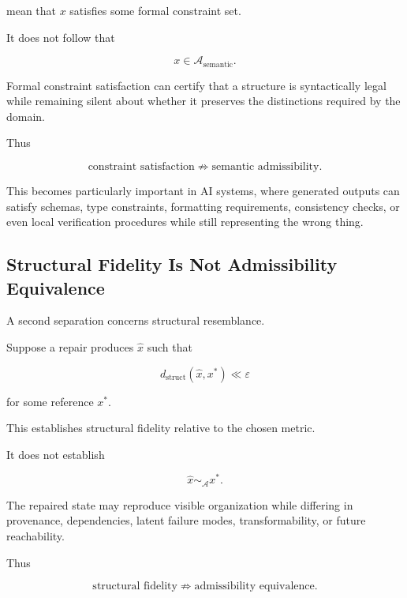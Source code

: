 \documentclass[11pt]{article}
\theoremstyle{remark}
\newcommand{\Adm}{\mathcal{A}}
\begin{document}
mean that $x$ satisfies some formal constraint set.

It does not follow that

\begin{equation}
x\in\mathcal{A}_{\mathrm{semantic}}.
\end{equation}

Formal constraint satisfaction can certify that a structure is syntactically legal while remaining silent about whether it preserves the distinctions required by the domain.

Thus

\begin{equation}
\boxed{
\text{constraint satisfaction}
\not\Rightarrow
\text{semantic admissibility}.
}
\end{equation}

This becomes particularly important in AI systems, where generated outputs can satisfy schemas, type constraints, formatting requirements, consistency checks, or even local verification procedures while still representing the wrong thing.

\subsection{Structural Fidelity Is Not Admissibility Equivalence}

A second separation concerns structural resemblance.

Suppose a repair produces $\hat{x}$ such that

\begin{equation}
d_{\mathrm{struct}}(\hat{x},x^\ast)
\ll\varepsilon
\end{equation}

for some reference $x^\ast$.

This establishes structural fidelity relative to the chosen metric.

It does not establish

\begin{equation}
\hat{x}\sim_{\Adm}x^\ast.
\end{equation}

The repaired state may reproduce visible organization while differing in provenance, dependencies, latent failure modes, transformability, or future reachability.

Thus

\begin{equation}
\boxed{
\text{structural fidelity}
\not\Rightarrow
\text{admissibility equivalence}.
}
\end{equation}
\end{document}
